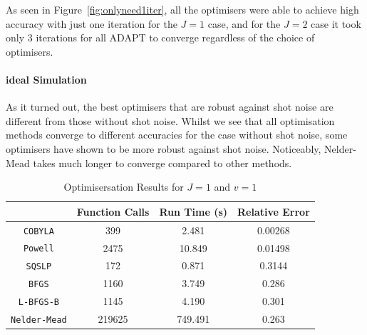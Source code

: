 As seen in Figure~\ref{fig:onlyneed1iter}, all the optimisers were able to achieve high accuracy with just one iteration for the $ J=1 $ case, and for the $ J=2 $ case it took only $ 3 $ iterations for all ADAPT to converge regardless of the choice of optimisers.

\paragraph{ideal Simulation}

As it turned out, the best optimisers that are robust against shot noise are different from those without shot noise. Whilst we see that all optimisation methods converge to different accuracies for the case without shot noise, some optimisers have shown to be more robust against shot noise. Noticeably, Nelder-Mead takes much longer to converge compared to other methods. 


\begin{table}[ht]
    \centering
    \caption{Optimisersation Results for $ J=1 $ and $ v = 1 $ }
    \label{tab:label}
    \begin{tabular}{c c c c}
	\toprule
	& \textbf{Function Calls} & \textbf{Run Time (s)} & \textbf{Relative Error} \\
	\midrule
	\texttt{COBYLA} & 399 & 2.481 & 0.00268 \\
	\texttt{Powell} & 2475 & 10.849 & 0.01498\\
	\texttt{SQSLP} & 172 & 0.871 & 0.3144 \\
	\texttt{BFGS} & 1160 & 3.749 & 0.286 \\
	\texttt{L-BFGS-B} & 1145 & 4.190 & 0.301  \\
	\texttt{Nelder-Mead} & 219625 & 749.491 & 0.263\\
	\bottomrule
    \end{tabular}
\end{table}

